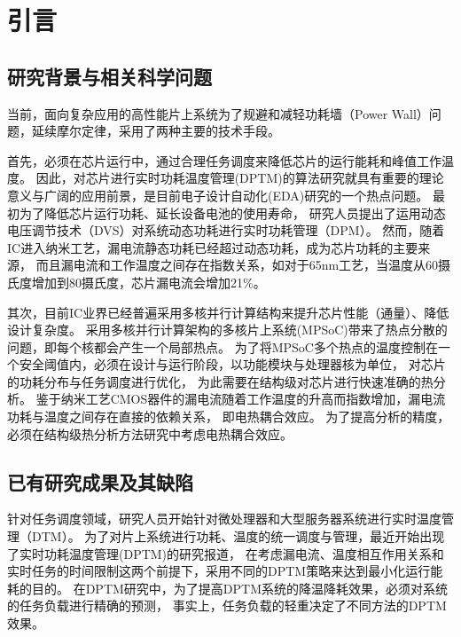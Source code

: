 


\chapter{引言}
\label{cha:intro}


\section{研究背景与相关科学问题}
当前，面向复杂应用的高性能片上系统为了规避和减轻功耗墙（Power Wall）问题，延续摩尔定律，采用了两种主要的技术手段。

首先，必须在芯片运行中，通过合理任务调度来降低芯片的运行能耗和峰值工作温度。 因此，对芯片进行实时功耗温度管理(DPTM)的算法研究就具有重要的理论意义与广阔的应用前景，是目前电子设计自动化(EDA)研究的一个热点问题。
最初为了降低芯片运行功耗、延长设备电池的使用寿命， 研究人员提出了运用动态电压调节技术（DVS）对系统动态功耗进行实时功耗管理（DPM）。 然而，随着IC进入纳米工艺，漏电流静态功耗已经超过动态功耗，成为芯片功耗的主要来源， 而且漏电流和工作温度之间存在指数关系，如对于65nm工艺，当温度从60摄氏度增加到80摄氏度，芯片漏电流会增加21\%。

其次，目前IC业界已经普遍采用多核并行计算结构来提升芯片性能（通量）、降低设计复杂度。 采用多核并行计算架构的多核片上系统(MPSoC)带来了热点分散的问题，即每个核都会产生一个局部热点。 为了将MPSoC多个热点的温度控制在一个安全阈值内，必须在设计与运行阶段，以功能模块与处理器核为单位， 对芯片的功耗分布与任务调度进行优化， 为此需要在结构级对芯片进行快速准确的热分析。 鉴于纳米工艺CMOS器件的漏电流随着工作温度的升高而指数增加，漏电流功耗与温度之间存在直接的依赖关系， 即电热耦合效应。 为了提高分析的精度，必须在结构级热分析方法研究中考虑电热耦合效应。


\section{已有研究成果及其缺陷}
针对任务调度领域，研究人员开始针对微处理器和大型服务器系统进行实时温度管理（DTM）。 为了对片上系统进行功耗、温度的统一调度与管理，最近开始出现了实时功耗温度管理(DPTM)的研究报道， 在考虑漏电流、温度相互作用关系和实时任务的时间限制这两个前提下，采用不同的DPTM策略来达到最小化运行能耗的目的。
在DPTM研究中，为了提高DPTM系统的降温降耗效果，必须对系统的任务负载进行精确的预测， 事实上，任务负载的轻重决定了不同方法的DPTM效果。

